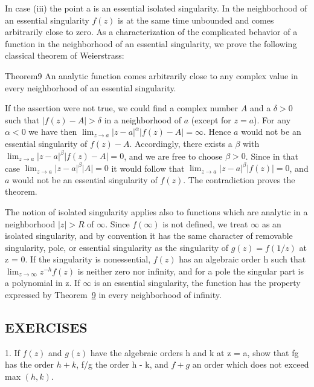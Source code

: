 In case (iii) the point a is an essential isolated singularity. In the neighborhood of an essential singularity $f(z)$ is at the same time unbounded and comes arbitrarily close to zero. As a characterization of the complicated behavior of a function in the neighborhood of an essential singularity, we prove the following classical theorem of Weierstrass:

\begin{originalstatement}{Theorem}{9}\label{thm:4.9}
An analytic function comes arbitrarily close to any complex value in every neighborhood of an essential singularity.
\end{originalstatement}
If the assertion were not true, we could find a complex number $A$ and a $\delta > 0$ such that $|f(z) - A| > \delta$ in a neighborhood of $a$ (except for $z = a$). For any $\alpha < 0$ we have then $\lim_{z \to a} |z - a|^{\alpha}| f(z) - A| = \infty$. Hence $a$ would not be an essential singularity of $f(z) - A$. Accordingly, there exists a $\beta$ with $\lim_{z \to a} |z - a|^{\beta}| f(z) - A| = 0$, and we are free to choose $\beta > 0$. Since in that case $\lim_{z \to a} |z - a|^{\beta}| A| = 0$ it would follow that $\lim_{z \to a} |z - a|^{\beta}| f(z)| = 0$, and $a$ would not be an essential singularity of $f(z)$. The contradiction proves the theorem.

The notion of isolated singularity applies also to functions which are analytic in a neighborhood $|z| > R$ of $\infty$. Since $f(\infty)$ is not defined, we treat $\infty$ as an isolated singularity, and by convention it has the same character of removable singularity, pole, or essential singularity as the singularity of $g(z) = f(1/z)$ at z = 0. If the singularity is nonessential, $f(z)$ has an algebraic order h such that $\lim_{z \to \infty} z^{-h} f(z)$ is neither zero nor infinity, and for a pole the singular part is a polynomial in z. If $\infty$ is an essential singularity, the function has the property expressed by Theorem~\hyperref[thm:4.9]{9} in every neighborhood of infinity.

\subsection*{EXERCISES}
1. If $f(z)$ and $g(z)$ have the algebraic orders h and k at z = a, show that fg has the order $h + k$, f/g the order h - k, and $f + g$ an order which does not exceed max $(h, k)$.



